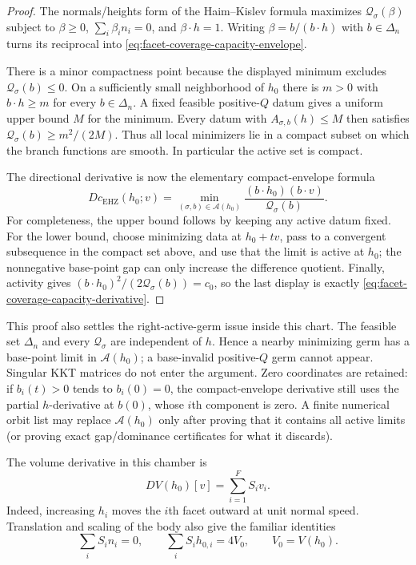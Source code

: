 \begin{unverified}
\begin{proof}
The normals/heights form of the Haim--Kislev formula maximizes
$\mathcal Q_\sigma(\beta)$ subject to
$\beta\geq0$, $\sum_i\beta_i n_i=0$, and $\beta\cdot h=1$.
Writing $\beta=b/(b\cdot h)$ with $b\in\Delta_n$ turns its reciprocal into
\eqref{eq:facet-coverage-capacity-envelope}.

There is a minor compactness point because the displayed minimum excludes
$\mathcal Q_\sigma(b)\leq0$.  On a sufficiently small neighborhood of $h_0$ there is
$m>0$ with $b\cdot h\geq m$ for every $b\in\Delta_n$.  A fixed feasible
positive-$Q$ datum gives a uniform upper bound $M$ for the minimum.  Every
datum with $A_{\sigma,b}(h)\leq M$ then satisfies
$\mathcal Q_\sigma(b)\geq m^2/(2M)$.  Thus all local minimizers lie in a compact
subset on which the branch functions are smooth.  In particular the active
set is compact.

The directional derivative is now the elementary compact-envelope formula
\[
  Dc_{\mathrm{EHZ}}(h_0;v)
  =\min_{(\sigma,b)\in\mathcal A(h_0)}
    \frac{(b\cdot h_0)(b\cdot v)}{\mathcal Q_\sigma(b)}.
\]
For completeness, the upper bound follows by keeping any active datum fixed.
For the lower bound, choose minimizing data at $h_0+tv$, pass to a convergent
subsequence in the compact set above, and use that the limit is active at
$h_0$; the nonnegative base-point gap can only increase the difference
quotient.  Finally, activity gives
$(b\cdot h_0)^2/(2\mathcal Q_\sigma(b))=c_0$, so the last display is exactly
\eqref{eq:facet-coverage-capacity-derivative}.
\end{proof}

This proof also settles the right-active-germ issue inside this chart.  The
feasible set $\Delta_n$ and every $\mathcal Q_\sigma$ are independent of $h$.  Hence a
nearby minimizing germ has a base-point limit in $\mathcal A(h_0)$; a
base-invalid positive-$Q$ germ cannot appear.  Singular KKT matrices do not
enter the argument.  Zero coordinates are retained: if $b_i(t)>0$ tends to
$b_i(0)=0$, the compact-envelope derivative still uses the partial
$h$-derivative at $b(0)$, whose $i$th component is zero.  A finite numerical
orbit list may replace $\mathcal A(h_0)$ only after proving that it contains
all active limits (or proving exact gap/dominance certificates for what it
discards).

The volume derivative in this chamber is
\begin{equation}\label{eq:facet-coverage-volume-derivative}
  DV(h_0)[v]=\sum_{i=1}^F S_i v_i.
\end{equation}
Indeed, increasing $h_i$ moves the $i$th facet outward at unit normal speed.
Translation and scaling of the body also give the familiar identities
\begin{equation}\label{eq:facet-coverage-minkowski-identities}
  \sum_i S_i n_i=0,
  \qquad
  \sum_i S_i h_{0,i}=4V_0,
  \qquad V_0=V(h_0).
\end{equation}


\end{unverified}
